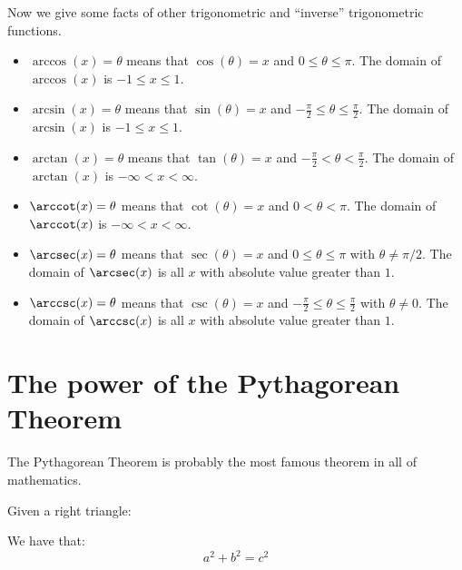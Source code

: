 \documentclass{ximera}
\begin{document}
Now we give some facts of other trigonometric and ``inverse''
trigonometric functions.

\begin{definition}\hfil
  \begin{itemize}
    \item $\arccos(x) = \theta$ means that $\cos(\theta) = x$ and
      $0\le \theta\le \pi$. The domain of $\arccos(x)$ is $-1\le x\le
      1$.
    \item $\arcsin(x) = \theta$ means that $\sin(\theta) = x$ and
      $-\frac{\pi}{2}\le \theta\le \frac{\pi}{2}$. The domain of
      $\arcsin(x)$ is $-1\le x\le 1$.
    \item $\arctan(x) = \theta$ means that $\tan(\theta) = x$ and
      $-\frac{\pi}{2}< \theta< \frac{\pi}{2}$. The domain of
      $\arctan(x)$ is $-\infty<x<\infty$.
    \item $\arccot(x) = \theta$ means that $\cot(\theta) = x$ and
      $0< \theta< \pi$. The domain of $\arccot(x)$ is
      $-\infty<x<\infty$.
    \item $\arcsec(x) = \theta$ means that $\sec(\theta) = x$ and
      $0\le \theta\le \pi$ with $\theta\ne \pi/2$. The domain of
      $\arcsec(x)$ is all $x$ with absolute value greater than $1$.
    \item $\arccsc(x) = \theta$ means that $\csc(\theta) = x$ and
      $-\frac{\pi}{2}\le \theta\le \frac{\pi}{2}$ with $\theta \ne 0$. The
      domain of $\arccsc(x)$ is all $x$ with absolute value greater
      than $1$.
  \end{itemize}
\end{definition}


\section{The power of the Pythagorean Theorem}

The Pythagorean Theorem is probably the most famous theorem in all of
mathematics.


\begin{theorem}
Given a right triangle:
\begin{image}[2in]
\end{image}
We have that:
\[
a^2 + b^2 = c^2
\]
\end{theorem}
\end{document}
